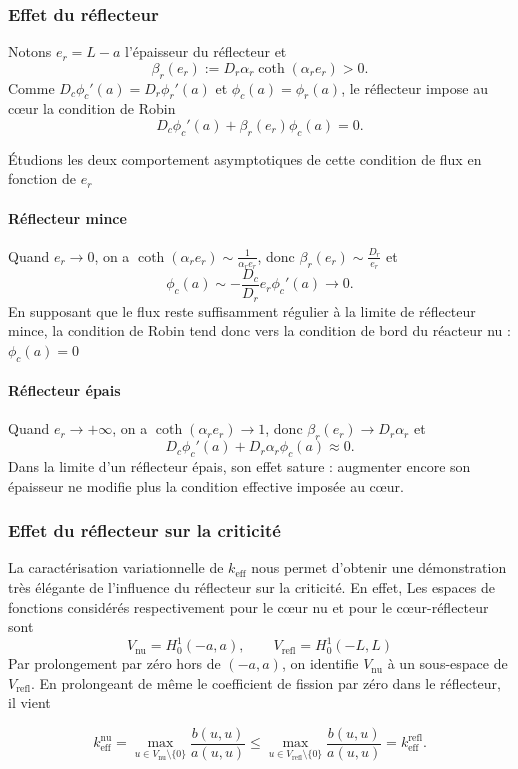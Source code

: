 \documentclass{article}
\newcommand{\keff}{k_{\mathrm{eff}}}
\begin{document}
\subsubsection{Effet du réflecteur}
Notons $e_r = L-a$ l'épaisseur du réflecteur et
\[
\beta_r(e_r):=D_r\alpha_r\coth(\alpha_re_r)>0.
\]
Comme $D_c\phi_c'(a)=D_r\phi_r'(a)$ et $\phi_c(a)=\phi_r(a)$, le réflecteur impose au cœur la condition de Robin
\[
\boxed{D_c\phi_c'(a)+\beta_r(e_r)\phi_c(a)=0}.
\]

Étudions les deux comportement asymptotiques de cette condition de flux en fonction de $e_r$

\paragraph{Réflecteur mince}
Quand $e_r \to 0$, on a \(\coth(\alpha_re_r) \sim \frac{1}{\alpha_re_r}\), donc $\beta_r(e_r) \sim \frac{D_r}{e_r}$ et
\[
\phi_c(a)\sim-\frac{D_c}{D_r}e_r\phi_c'(a)\longrightarrow0.
\]
En supposant que le flux reste suffisamment régulier à la limite de réflecteur mince, la condition de Robin tend donc vers la condition de bord du réacteur nu :  $\phi_c(a) = 0$

\paragraph{Réflecteur épais }
Quand $e_r \to +\infty$, on a \(\coth(\alpha_re_r) \to 1\), donc $\beta_r(e_r)\to D_r\alpha_r$ et
\[
D_c\phi_c'(a)+D_r\alpha_r\phi_c(a)\approx0.
\]
Dans la limite d'un réflecteur épais, son effet sature : augmenter encore son épaisseur ne modifie plus la condition effective imposée au cœur.

\subsubsection{Effet du réflecteur sur la criticité}
La caractérisation variationnelle de $\keff$ nous permet d'obtenir une démonstration très élégante de l'influence du réflecteur sur la criticité. En effet, Les espaces de fonctions considérés respectivement pour le cœur nu et pour le cœur-réflecteur sont 
\[
V_{\mathrm{nu}} = H^1_0(-a,a), \qquad V_{\mathrm{refl}} = H^1_0(-L,L)
\]
Par prolongement par zéro hors de $(-a,a)$, on identifie $V_{\mathrm{nu}}$ à un sous-espace de $V_{\mathrm{refl}}$. En prolongeant de même le coefficient de fission par zéro dans le réflecteur, il vient

\begin{equation}
    \keff^{\mathrm{nu}} = \max_{u\in V_{\mathrm{nu}}\setminus\{0\}} \frac{b(u,u)}{a(u,u)}\le \max_{u\in V_{\mathrm{refl}}\setminus\{0\}} \frac{b(u,u)}{a(u,u)} =  \keff^{\mathrm{refl}}.
\end{equation}
\end{document}
